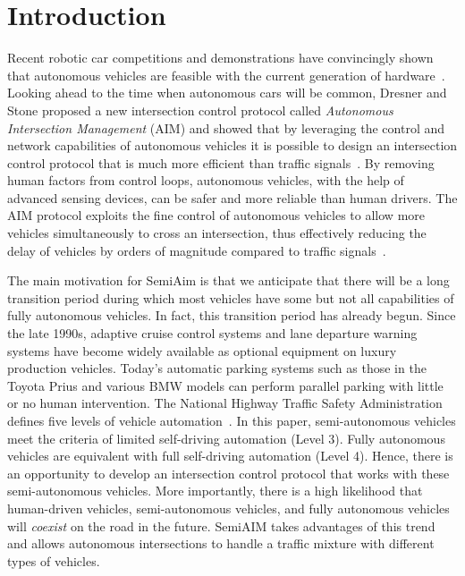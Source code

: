 \section{Introduction}
\label{sec:introduction}

Recent robotic car competitions and demonstrations have convincingly
shown that autonomous vehicles are feasible with the current
generation of hardware~\cite{mybib:Darpa07Urban}. Looking ahead to the
time when autonomous cars will be common, Dresner and Stone proposed a
new intersection control protocol called \emph{Autonomous Intersection
  Management} (AIM) and showed that by leveraging the control and
network capabilities of autonomous vehicles it is possible to design
an intersection control protocol that is much more efficient than
traffic signals~\cite{bib:Dresner08Multiagent}.  By removing human
factors from control loops, autonomous vehicles, with the help of
advanced sensing devices, can be safer and more reliable than human
drivers.  The AIM protocol exploits the fine control of autonomous
vehicles to allow more vehicles simultaneously to cross an
intersection, thus effectively reducing the delay of vehicles by
orders of magnitude compared to traffic
signals~\cite{bib:Fajardo12Automated}.

The main motivation for SemiAim is that we anticipate that there will
be a long transition period during which most vehicles have some but
not all capabilities of fully autonomous vehicles.  In fact, this
transition period has already begun. Since the late 1990s, adaptive
cruise control systems and lane departure warning systems have become
widely available as optional equipment on luxury production vehicles.
Today's automatic parking systems such as those in the Toyota Prius
and various BMW models can perform parallel parking with little or no
human intervention. The National Highway Traffic Safety Administration
defines five levels of vehicle automation~\cite{NHTSA2013}. In this
paper, semi-autonomous vehicles meet the criteria of limited
self-driving automation (Level 3). Fully autonomous vehicles are
equivalent with full self-driving automation (Level 4).  Hence, there
is an opportunity to develop an intersection control protocol that
works with these semi-autonomous vehicles.  More importantly, there is
a high likelihood that human-driven vehicles, semi-autonomous
vehicles, and fully autonomous vehicles will \emph{coexist} on the
road in the future.  SemiAIM takes advantages of this trend and allows
autonomous intersections to handle a traffic mixture with different
types of vehicles.


